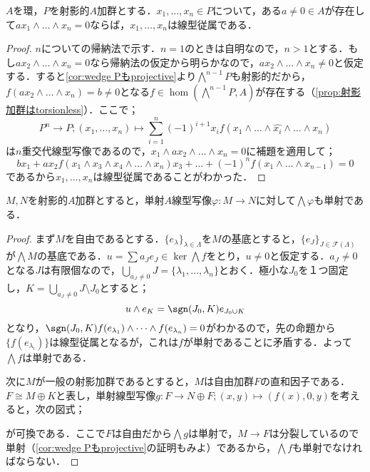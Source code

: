 \begin{prop}
	$A$を環，$P$を射影的$A$加群とする．$x_1,\dots,x_n\in P$について，ある$a\neq0\in A$が存在して$ax_1\wedge\dots\wedge x_n=0$ならば，$x_1,\dots,x_n$は線型従属である．
\end{prop}

\begin{proof}
	$n$についての帰納法で示す．$n=1$のときは自明なので，$n>1$とする．もし$ax_2\wedge\dots\wedge x_n=0$なら帰納法の仮定から明らかなので，$ax_2\wedge\dots\wedge x_n\neq0$と仮定する．すると\ref{cor:wedge Pもprojective}より$\bigwedge^{n-1} P$も射影的だから，$f(ax_2\wedge\dots\wedge x_n)=b\neq0$となる$f\in\hom(\bigwedge^{n-1} P,A)$が存在する（\ref{prop:射影加群はtorsionless}）．ここで；
	\[P^n\to P;(x_1,\dots,x_n)\mapsto\sum_{i=1}^n(-1)^{i+1}x_i f(x_1\wedge\dots\wedge\widehat{x_i}\wedge\dots\wedge x_n)\]
	は$n$重交代線型写像であるので，$x_1\wedge ax_2\wedge\dots\wedge x_n=0$に補題を適用して；
	\[bx_1+ax_2f(x_1\wedge x_3\wedge x_4\wedge\dots\wedge x_n)x_3+\dots+(-1)^n f(x_1\wedge\dots\wedge x_{n-1})=0\]
	であるから$x_1,\dots,x_n$は線型従属であることがわかった．
\end{proof}

\begin{thm}
	$M,N$を射影的$A$加群とすると，単射$A$線型写像$\varphi:M\to N$に対して$\bigwedge\varphi$も単射である．
\end{thm}

\begin{proof}
	まず$M$を自由であるとする．$\{e_\lambda\}_{\lambda\in\Lambda}$を$M$の基底とすると，$\{e_J\}_{J\in\mathcal{F}(\Lambda)}$が$\bigwedge M$の基底である．$u=\sum a_Je_J\in\ker\bigwedge f$をとり，$u\neq 0$と仮定する．$a_J\neq 0$となる$J$は有限個なので，$\bigcup_{a_J\neq0}J=\{\lambda_1,\dots,\lambda_n\}$とおく．極小な$J_0$を１つ固定し，$K=\bigcup_{a_J\neq0}J\setminus J_0$とすると；
	\[u\wedge e_K=\sgn(J_0,K)e_{J_0\cup K}\]
	となり，$\sgn(J_0,K)f(e_{\lambda_1})\wedge\dots\wedge f(e_{\lambda_n})=0$がわかるので，先の命題から$\{f(e_{\lambda_i})\}$は線型従属となるが，これは$f$が単射であることに矛盾する．よって$\bigwedge f$は単射である．
	
	次に$M$が一般の射影加群であるとすると，$M$は自由加群$F$の直和因子である．$F\cong M\oplus K$と表し，単射線型写像$g:F\to N\oplus F;(x,y)\mapsto (f(x),0,y)$を考えると，次の図式；
	\begin{figure}[H]
		\centering
		\caption{}
	\end{figure}
	が可換である．ここで$F$は自由だから$\bigwedge g$は単射で，$M\to F$は分裂しているので単射（\ref{cor:wedge Pもprojective}の証明もみよ）であるから，$\bigwedge f$も単射でなければならない．
\end{proof}

